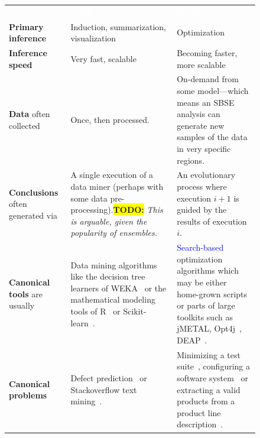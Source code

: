 \documentclass[sigconf,anonymous,review]{acmart}
\newcommand\TODO[1]{\textcolor{ScarletRed}{\textbf{\colorbox{yellow}{\small TODO:}} \emph{#1}}\xspace}
\newcommand\llm[1]{\textcolor{blue}{#1\xspace}}
\begin{document}
\begin{figure}
    \centering
    \begin{tabular}{@{}p{3cm}p{6cm}p{8.35cm}@{}}
                
                \rowcolor{gray}\textcolor{white}{\textbf{Features}} & \hspace{2cm}\textcolor{white}{\textbf{MSR}} & \hspace{3cm}\textcolor{white}{\textbf{SBSE}} \\ 
                 \rowcolor{gray!30} \textbf{Primary inference} & Induction, summarization, visualization & Optimization \\
                \textbf{Inference speed} & Very fast, scalable & Becoming faster, more scalable\\
                 \rowcolor{gray!30}\textbf{Data} often collected &
                 Once,  then processed.
                &
                On-demand
                from  some model---which means an SBSE analysis can 
                generate new samples of the data in very  specific regions.
                \\ 
                \textbf{Conclusions} often 
                generated via
                &
                A single  execution of a data miner
                (perhaps with some data pre-processing).\TODO{This is arguable, given the popularity of ensembles.} 
                &
                An evolutionary process  where execution $i+1$ is guided
                by the results of execution $i$.
                \\ 
                 
                 \rowcolor{gray!30}\textbf{Canonical   tools} are usually
                &
                Data mining algorithms like  the decision
                tree learners of WEKA~\cite{hall2009weka} or the mathematical modeling tools of R~\cite{rmanual18} or Scikit-learn~\cite{scikit-learn}.
                &
                \llm{Search-based} optimization algorithms which may be either home-grown scripts or parts of large toolkits such as jMETAL\cite{refs2jmetalDEE}, Opt4j~\cite{opt4jpaper}, DEAP~\cite{DEAP_JMLR2012}.
                \\ 
                \textbf{Canonical   problems}
                &
                Defect prediction~\cite{lessmann2008benchmarking}   or Stackoverflow text mining~\cite{fu2017easy}. 
                &
                Minimizing a test suite~\cite{fraser2007redundancy}, configuring a software system~\cite{nair2017faster} or extracting a valid products from a product line description~\cite{sayyad13b}.
                \\ 
                

\end{tabular}
\end{figure}
\end{document}

